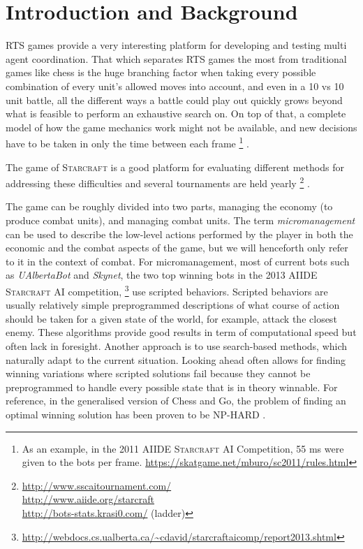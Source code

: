 \section{Introduction and Background}
RTS games provide a very interesting platform for developing and testing multi agent coordination.
That which separates RTS games the most from traditional games like chess is the huge branching factor when taking every possible combination of every unit's allowed moves into account, and even in a 10 vs 10 unit battle, all the different ways a battle could play out quickly grows beyond what is feasible to perform an exhaustive search on.
On top of that, a complete model of how the game mechanics work might not be available, and new decisions have to be taken in only the time between each frame
\footnote{
As an example, in the 2011 AIIDE \textsc{Starcraft} AI Competition, 55 ms were given to the bots per frame.
\url{https://skatgame.net/mburo/sc2011/rules.html}
}
.

The game of \textsc{Starcraft} is a good platform for evaluating different methods for addressing these difficulties and several tournaments are held yearly
\footnote{
\url{http://www.sscaitournament.com/}\\ 
\url{http://www.aiide.org/starcraft} \\
\url{http://bots-stats.krasi0.com/} (ladder)
}
.

The game can be roughly divided into two parts, managing the economy (to produce combat units), and managing combat units.
The term \emph{micromanagement} can be used to describe the low-level actions performed by the player in both the economic and the combat aspects of the game, but we will henceforth only refer to it in the context of combat.
For micromanagement, most of current bots such as \emph{UAlbertaBot} and \emph{Skynet}, the two top winning bots in the 2013 AIIDE \textsc{Starcraft} AI competition,
\footnote{\url{http://webdocs.cs.ualberta.ca/~cdavid/starcraftaicomp/report2013.shtml}
}
use scripted behaviors.
Scripted behaviors are usually relatively simple preprogrammed descriptions of what course of action should be taken for a given state of the world, for example, attack the closest enemy.
These algorithms provide good results in term of computational speed but often lack in foresight.
Another approach is to use search-based methods, which naturally adapt to the current situation.
Looking ahead often allows for finding winning variations where scripted solutions fail because they cannot be preprogrammed to handle every possible state that is in theory winnable.
For reference, in the generalised version of Chess and Go, the problem of finding an optimal winning solution has been proven to be NP-HARD \cite{nphard}.

